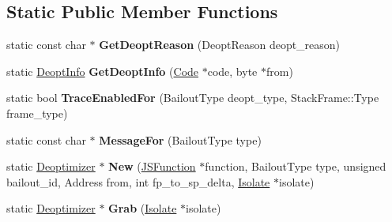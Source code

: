 \subsection*{Static Public Member Functions}
\begin{DoxyCompactItemize}
\item 
static const char $\ast$ {\bfseries Get\+Deopt\+Reason} (Deopt\+Reason deopt\+\_\+reason)\hypertarget{classv8_1_1internal_1_1_deoptimizer_ab02b250a9c787c038fec6afdd9f77e03}{}\label{classv8_1_1internal_1_1_deoptimizer_ab02b250a9c787c038fec6afdd9f77e03}

\item 
static \hyperlink{structv8_1_1internal_1_1_deoptimizer_1_1_deopt_info}{Deopt\+Info} {\bfseries Get\+Deopt\+Info} (\hyperlink{classv8_1_1internal_1_1_code}{Code} $\ast$code, byte $\ast$from)\hypertarget{classv8_1_1internal_1_1_deoptimizer_af5caf0cf1e8689cc2b1c1a3bcf74e098}{}\label{classv8_1_1internal_1_1_deoptimizer_af5caf0cf1e8689cc2b1c1a3bcf74e098}

\item 
static bool {\bfseries Trace\+Enabled\+For} (Bailout\+Type deopt\+\_\+type, Stack\+Frame\+::\+Type frame\+\_\+type)\hypertarget{classv8_1_1internal_1_1_deoptimizer_a66cf8bee838088cb18f415178128ddff}{}\label{classv8_1_1internal_1_1_deoptimizer_a66cf8bee838088cb18f415178128ddff}

\item 
static const char $\ast$ {\bfseries Message\+For} (Bailout\+Type type)\hypertarget{classv8_1_1internal_1_1_deoptimizer_a5b3d6461cb9a96ceefeabd262ee476f1}{}\label{classv8_1_1internal_1_1_deoptimizer_a5b3d6461cb9a96ceefeabd262ee476f1}

\item 
static \hyperlink{classv8_1_1internal_1_1_deoptimizer}{Deoptimizer} $\ast$ {\bfseries New} (\hyperlink{classv8_1_1internal_1_1_j_s_function}{J\+S\+Function} $\ast$function, Bailout\+Type type, unsigned bailout\+\_\+id, Address from, int fp\+\_\+to\+\_\+sp\+\_\+delta, \hyperlink{classv8_1_1internal_1_1_isolate}{Isolate} $\ast$isolate)\hypertarget{classv8_1_1internal_1_1_deoptimizer_a2ba617cb5ef7bc82cc0c30c041ae6b00}{}\label{classv8_1_1internal_1_1_deoptimizer_a2ba617cb5ef7bc82cc0c30c041ae6b00}

\item 
static \hyperlink{classv8_1_1internal_1_1_deoptimizer}{Deoptimizer} $\ast$ {\bfseries Grab} (\hyperlink{classv8_1_1internal_1_1_isolate}{Isolate} $\ast$isolate)\hypertarget{classv8_1_1internal_1_1_deoptimizer_a078aeb9b54269abe7f5f922c2ca540e8}{}\label{classv8_1_1internal_1_1_deoptimizer_a078aeb9b54269abe7f5f922c2ca540e8}


\end{DoxyCompactItemize}
